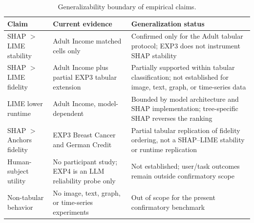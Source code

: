 \documentclass[twoside,11pt]{article}
\begin{document}
\begin{table}[t]
\centering
\caption{Generalizability boundary of empirical claims.}
\label{tab:generalizability_boundary}
\begin{tabularx}{\linewidth}{l X X}
\toprule
\textbf{Claim} & \textbf{Current evidence} & \textbf{Generalization status} \\
\midrule
SHAP $>$ LIME stability & Adult Income matched cells only & Confirmed only for the Adult tabular protocol; EXP3 does not instrument SHAP stability \\
SHAP $>$ LIME fidelity & Adult Income plus partial EXP3 tabular extension & Partially supported within tabular classification; not established for image, text, graph, or time-series data \\
LIME lower runtime & Adult Income, model-dependent & Bounded by model architecture and SHAP implementation; tree-specific SHAP reverses the ranking \\
SHAP $>$ Anchors fidelity & EXP3 Breast Cancer and German Credit & Partial tabular replication of fidelity ordering, not a SHAP--LIME stability or runtime replication \\
Human-subject utility & No participant study; EXP4 is an LLM reliability probe only & Not established; user/task outcomes remain outside confirmatory scope \\
Non-tabular behavior & No image, text, graph, or time-series experiments & Out of scope for the present confirmatory benchmark \\
\bottomrule
\end{tabularx}
\end{table}
\end{document}

